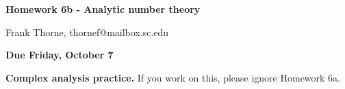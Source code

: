 \documentclass[12pt]{article}
\begin{document}
\setlength{\topmargin}{-2mm}
\newtheorem{problem}{Problem}
\newtheorem{theorem}{Theorem}[section]
\newtheorem{lemma}[theorem]{Lemma}
\newtheorem{corollary}[theorem]{Corollary}
\newtheorem{proposition}[theorem]{Proposition}
\newtheorem{conjecture}{Conjecture}
\newtheorem{definition}{Definition}




\begin{center}{\bf Homework 6b - Analytic number theory}
\end{center}
\begin{center}Frank Thorne, thornef@mailbox.sc.edu
\end{center}
\begin{center}
{\bf Due Friday, October 7}
\end{center}
{\bf
Complex analysis practice.}
If you work on this, please ignore Homework 6a.
\end{document}
